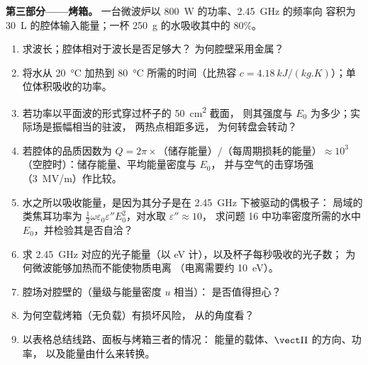 \begin{problem}
\medskip
\noindent\textbf{第三部分——烤箱。}
一台微波炉以 \qty{800}{W} 的功率、\qty{2.45}{GHz} 的频率向
容积为 \qty{30}{L} 的腔体输入能量；一杯 \qty{250}{g} 的水吸收其中的 $80\%$。
\begin{enumerate}[resume]
  \item 求波长；腔体相对于波长是否足够大？
        为何腔壁采用金属？
  \item 将水从 \qty{20}{\degreeCelsius} 加热到 \qty{80}{\degreeCelsius}
        所需的时间（比热容 $c = \qty{4.18}{kJ/(kg.K)}$）；单位体积吸收的功率。
  \item 若功率以平面波的形式穿过杯子的 \qty{50}{cm^2} 截面，
        则其强度与 $E_0$ 为多少；实际场是振幅相当的驻波，
        两热点相距多远，
        为何转盘会转动？
  \item 若腔体的品质因数为
        $Q = 2\pi\times\text{（储存能量）}/\text{（每周期损耗的能量）}
        \approx 10^3$（空腔时）：储存能量、平均能量密度与 $E_0$，
        并与空气的击穿场强（\qty{3}{MV/m}）作比较。
  \item 水之所以吸收能量，是因为其分子是在 \qty{2.45}{GHz} 下被驱动的偶极子：
        局域的类焦耳功率为 $\tfrac12\omega\varepsilon_0
        \varepsilon''E_0^2$，对水取 $\varepsilon'' \approx 10$，
        求问题 16 中功率密度所需的水中 $E_0$，并检验其是否自洽？
  \item 求 \qty{2.45}{GHz} 对应的光子能量（以 eV 计），以及杯子每秒吸收的光子数；
        为何微波能够加热而不能使物质电离
        （电离需要约 \qty{10}{eV}）。
  \item 腔场对腔壁的（量级与能量密度 $u$ 相当）：
        是否值得担心？
  \item 为何空载烤箱（无负载）有损坏风险，
        从的角度看？
  \item 以表格总结线路、面板与烤箱三者的情况：
        能量的载体、$\vect\Pi$ 的方向、功率，
        以及能量由什么来转换。
\end{enumerate}
\end{problem}
